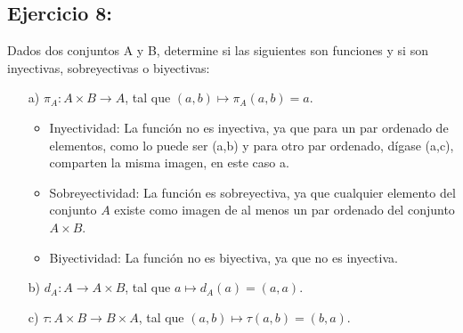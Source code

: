\documentclass{templateNote}
\begin{document}
\subsection*{\textbf{Ejercicio 8:}}
Dados dos conjuntos A y B, determine si las siguientes son funciones y si son inyectivas, sobreyectivas o biyectivas: 
\begin{itemize}
    \item[a)] $\pi_A : A \times B \rightarrow A$, tal que $(a,b) \mapsto \pi_A(a,b) = a$.
    \begin{itemize}
        \item Inyectividad: La función no es inyectiva, ya que para un par ordenado de elementos, como lo puede ser (a,b) y para otro par ordenado, dígase (a,c), comparten la misma imagen, en este caso a.
        \item Sobreyectividad: La función es sobreyectiva, ya que cualquier elemento del conjunto $A$ existe como imagen de al menos un par ordenado del conjunto $A \times B$. 
        \item Biyectividad: La función no es biyectiva, ya que no es inyectiva.
    \end{itemize}
    \item[b)] $d_A : A \rightarrow A \times B$, tal que $a \mapsto d_A(a) = (a,a)$.
    \item[c)] $\tau : A \times B \rightarrow B \times A$, tal que $(a,b) \mapsto \tau(a,b) = (b,a)$.
\end{itemize}
\end{document}

